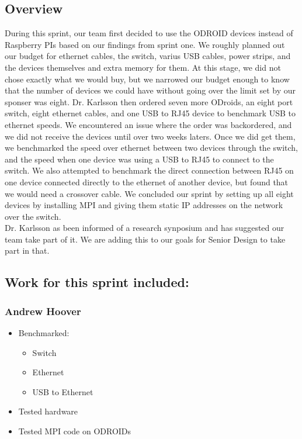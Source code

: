 \subsection*{Overview}
During this sprint, our team first decided to use the ODROID devices instead of Raspberry PIs based on our findings from sprint one. We roughly planned out our budget for ethernet cables, the switch, varius USB cables, power strips, and the devices themselves and extra memory for them. At this stage, we did not chose exactly what we would buy, but we narrowed our budget enough to know that the number of devices we could have without going over the limit set by our sponser was eight. Dr. Karlsson then ordered seven more ODroids, an eight port switch, eight ethernet cables, and one USB to RJ45 device to benchmark USB to ethernet speeds. We encountered an issue where the order was backordered, and we did not receive the devices until over two weeks laters. Once we did get them, we benchmarked the speed over ethernet between two devices through the switch, and the speed when one device was using a USB to RJ45 to connect to the switch. We also attempted to benchmark the direct connection between RJ45 on one device connected directly to the ethernet of another device, but found that we would need a crossover cable. We concluded our sprint by setting up all eight devices by installing MPI and giving them static IP addresses on the network over the switch. \\

Dr. Karlsson as been informed of a research synposium and has suggested our team take part of it. We are adding this to our goals for Senior Design to take part in that.

\subsection*{Work for this sprint included:}

\subsubsection*{Andrew Hoover}
\begin{itemize}
	\item Benchmarked:
		\begin{itemize}
			\item Switch
			\item Ethernet
			\item USB to Ethernet
		\end{itemize}
	\item Tested hardware
	\item Tested MPI code on ODROIDs
\end{itemize}

